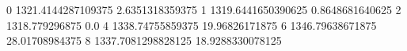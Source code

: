 0 1321.4144287109375 2.6351318359375
1 1319.6441650390625 0.8648681640625
2 1318.779296875 0.0
4 1338.74755859375 19.96826171875
6 1346.79638671875 28.01708984375
8 1337.7081298828125 18.9288330078125
